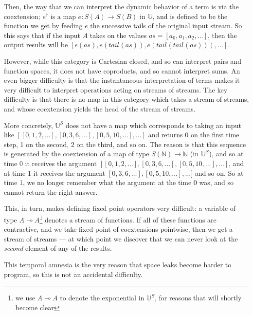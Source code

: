 \documentclass[preprint]{sigplanconf}
\newcommand{\ultrametric}{\mathbb{U}}
\newcommand{\N}{\mathbb{N}}
\newcommand{\lolli}{\multimap}
\newcommand{\tail}[2][]{\mathit{tail}^{#1}(#2)}
\begin{document}
Then, the way that we can interpret the dynamic behavior of a term is
via the coextension; $e^\dagger$ is a map $e : S(A) \to S(B)$ in
$\ultrametric$, and is defined to be the function we get by feeding
$e$ the successive tails of the original input stream. So this says
that if the input $A$ takes on the values $as = [a_0, a_1, a_2,
  \ldots]$, then the output results will be $[e(as), e(\tail{as}),
  e(\tail{\tail{as}}), \ldots]$.

However, while this category is Cartesian closed, and so can interpret
pairs and function spaces, it does not have coproducts, and so cannot
interpret sums. An even bigger difficulty is that the instantaneous
interpretation of terms makes it very difficult to interpret
operations acting on streams of streams. The key difficulty is that
there is no map in this category which takes a stream of streams, and
whose coextension yields the head of the stream of streams.

More concretely, $\ultrametric^S$ does not have a map which
corresponds to taking an input like $[[0,1,2,\ldots], [0,3,6,\ldots],
  [0,5,10,\ldots], \ldots]$ and returns 0 on the first time step, 1 on
the second, 2 on the third, and so on. The reason is that this
sequence is generated by the coextension of a map of type $S(\N) \to
\N$ (in $\ultrametric^S$), and so at time 0 it receives the argument
$[[0,1,2,\ldots], [0,3,6,\ldots], [0,5,10,\ldots], \ldots]$, and at
time 1 it receives the argument $[0,3,6,\ldots], [0,5,10,\ldots],
\ldots]$ and so on. So at time 1, we no longer remember what the
argument at the time 0 was, and so cannot return the right answer.


This, in turn, makes defining fixed point operators very difficult: a
variable of type $A \lolli A$\footnote{we use $A \lolli A$ to denote
the exponential in $\ultrametric^S$, for reasons that will shortly
become clear} denotes a stream of functions. If all of these
functions are contractive, and we take fixed point of coextensions
pointwise, then we get a stream of streams --- at which point we
discover that we can never look at the \emph{second} element of any of
the results.

This temporal amnesia is the very reason that space leaks become
harder to program, so this is not an accidental difficulty. 
\end{document}
